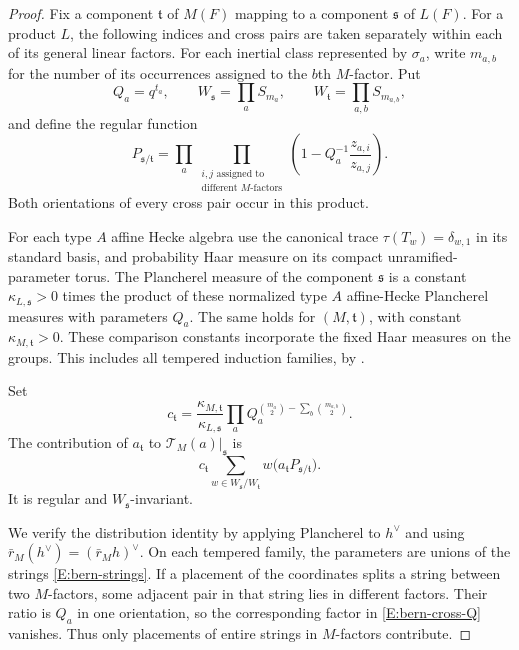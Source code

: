 \documentclass[11pt,a4paper]{amsart}
\theoremstyle{definition}
\theoremstyle{remark}
\newcommand{\grs}{\mathfrak s}
\newcommand{\grt}{\mathfrak t}
\begin{document}
\begin{proof}
Fix a component $\grt$ of $M(F)$ mapping to a component $\grs$ of $L(F)$.
For a product $L$, the following indices and cross pairs are taken
separately within each of its general linear factors.
For each inertial class represented by $\sigma_a$, write $m_{a,b}$ for the number of its
occurrences assigned to the $b$th $M$-factor. Put
$$
 Q_a=q^{t_a},\qquad
 W_\grs=\prod_a S_{m_a},\qquad
 W_\grt=\prod_{a,b}S_{m_{a,b}},
$$
and define the regular function
\begin{equation}\label{E:bern-cross-Q}
 P_{\grs/\grt}
 =\prod_a
  \prod_{\substack{i,j\text{ assigned to}\\
                     \text{different }M\text{-factors}}}
       \left(1-Q_a^{-1}\frac{z_{a,i}}{z_{a,j}}\right).
\end{equation}
Both orientations of every cross pair occur in this product.

For each type $A$ affine Hecke algebra use the canonical trace
$\tau(T_w)=\delta_{w,1}$ in its standard basis, and probability
Haar measure on its compact unramified-parameter torus.
The Plancherel measure of the component $\grs$ is a constant
$\kappa_{L,\grs}>0$ times the product of these normalized type $A$
affine-Hecke Plancherel measures with parameters $Q_a$.
The same holds for $(M,\grt)$, with constant
$\kappa_{M,\grt}>0$. These comparison constants incorporate the
fixed Haar measures on the groups. This includes all tempered induction families,
by \cite[Theorems 5.7 and 6.12]{AP}.

Set
$$
 c_\grt
 =\frac{\kappa_{M,\grt}}{\kappa_{L,\grs}}
   \prod_a Q_a^{\binom{m_a}{2}-\sum_b\binom{m_{a,b}}{2}}.
$$
The contribution of $a_\grt$ to $\mathcal T_M(a)|_\grs$ is
\begin{equation}\label{E:bern-transfer-polynomial}
 c_\grt\sum_{w\in W_\grs/W_\grt}
        w\bigl(a_\grt P_{\grs/\grt}\bigr).
\end{equation}
It is regular and $W_\grs$-invariant.

We verify the distribution identity by applying Plancherel to $h^\vee$
and using $\bar r_M(h^\vee)=(\bar r_Mh)^\vee$. On each tempered family, the parameters
are unions of the strings \eqref{E:bern-strings}. If a placement of the
coordinates splits a string between two $M$-factors, some adjacent
pair in that string lies in different factors. Their ratio is $Q_a$
in one orientation, so the corresponding factor in
\eqref{E:bern-cross-Q} vanishes. Thus only placements of entire strings
in $M$-factors contribute.


\end{proof}
\end{document}
